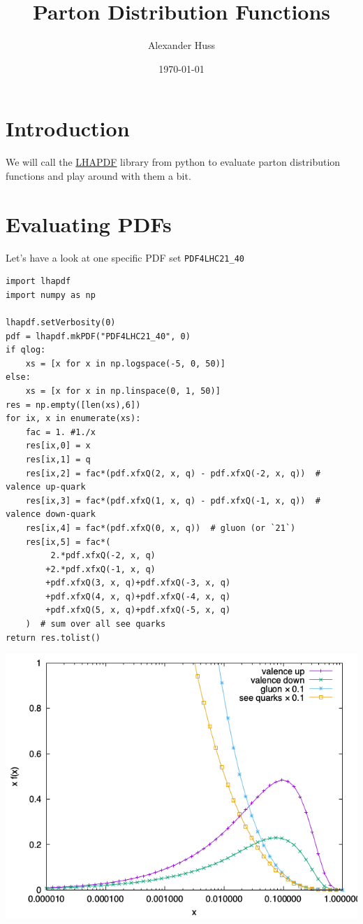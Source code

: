 \documentclass[11pt]{article}
\author{Alexander Huss}
\date{\today}
\title{Parton Distribution Functions}
\begin{document}
\maketitle
\tableofcontents

\section{Introduction}
\label{sec:orgf5fdfe5}
We will call the \href{https://lhapdf.hepforge.org/}{LHAPDF} library from python to evaluate parton distribution functions and play around with them a bit.
\section{Evaluating PDFs}
\label{sec:orgb879fd3}
Let's have a look at one specific PDF set \texttt{PDF4LHC21\_40}

\begin{verbatim}
import lhapdf
import numpy as np

lhapdf.setVerbosity(0)
pdf = lhapdf.mkPDF("PDF4LHC21_40", 0)
if qlog:
    xs = [x for x in np.logspace(-5, 0, 50)]
else:
    xs = [x for x in np.linspace(0, 1, 50)]
res = np.empty([len(xs),6])
for ix, x in enumerate(xs):
    fac = 1. #1./x
    res[ix,0] = x
    res[ix,1] = q
    res[ix,2] = fac*(pdf.xfxQ(2, x, q) - pdf.xfxQ(-2, x, q))  # valence up-quark
    res[ix,3] = fac*(pdf.xfxQ(1, x, q) - pdf.xfxQ(-1, x, q))  # valence down-quark
    res[ix,4] = fac*(pdf.xfxQ(0, x, q))  # gluon (or `21`)
    res[ix,5] = fac*(
         2.*pdf.xfxQ(-2, x, q)
        +2.*pdf.xfxQ(-1, x, q)
        +pdf.xfxQ(3, x, q)+pdf.xfxQ(-3, x, q)
        +pdf.xfxQ(4, x, q)+pdf.xfxQ(-4, x, q)
        +pdf.xfxQ(5, x, q)+pdf.xfxQ(-5, x, q)
    )  # sum over all see quarks
return res.tolist()
\end{verbatim}

\begin{center}
\includegraphics[width=.9\linewidth]{pdf_xfx.png}
\label{}
\end{center}
\end{document}

